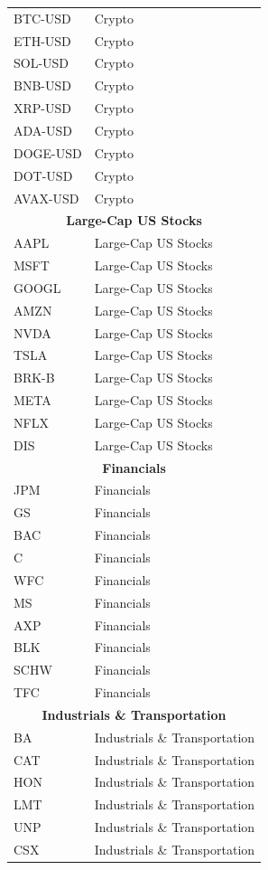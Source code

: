 \begin{longtable}{ll}
BTC-USD  & Crypto \\
ETH-USD  & Crypto \\
SOL-USD  & Crypto \\
BNB-USD  & Crypto \\
XRP-USD  & Crypto \\
ADA-USD  & Crypto \\
DOGE-USD & Crypto \\
DOT-USD  & Crypto \\
AVAX-USD & Crypto \\
\multicolumn{2}{c}{\textbf{Large-Cap US Stocks}} \\
AAPL  & Large-Cap US Stocks \\
MSFT  & Large-Cap US Stocks \\
GOOGL & Large-Cap US Stocks \\
AMZN  & Large-Cap US Stocks \\
NVDA  & Large-Cap US Stocks \\
TSLA  & Large-Cap US Stocks \\
BRK-B & Large-Cap US Stocks \\
META  & Large-Cap US Stocks \\
NFLX  & Large-Cap US Stocks \\
DIS   & Large-Cap US Stocks \\
\multicolumn{2}{c}{\textbf{Financials}} \\
JPM  & Financials \\
GS   & Financials \\
BAC  & Financials \\
C    & Financials \\
WFC  & Financials \\
MS   & Financials \\
AXP  & Financials \\
BLK  & Financials \\
SCHW & Financials \\
TFC  & Financials \\
\multicolumn{2}{c}{\textbf{Industrials \& Transportation}} \\
BA  & Industrials \& Transportation \\
CAT & Industrials \& Transportation \\
HON & Industrials \& Transportation \\
LMT & Industrials \& Transportation \\
UNP & Industrials \& Transportation \\
CSX & Industrials \& Transportation \\

\end{longtable}
